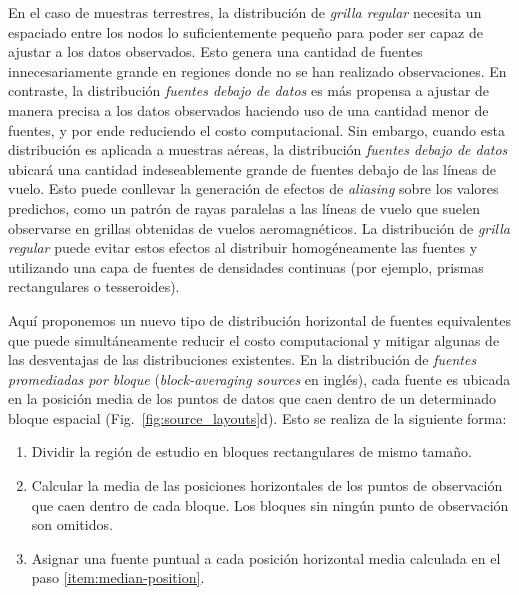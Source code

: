 En el caso de muestras terrestres, la distribución de \emph{grilla regular}
necesita un espaciado entre los nodos lo suficientemente pequeño para poder ser
capaz de ajustar a los datos observados.
Esto genera una cantidad de fuentes innecesariamente grande en regiones donde
no se han realizado observaciones.
En contraste, la distribución \emph{fuentes debajo de datos} es más propensa
a ajustar de manera precisa a los datos observados haciendo uso de una cantidad
menor de fuentes, y por ende reduciendo el costo computacional.
Sin embargo, cuando esta distribución es aplicada a muestras aéreas, la
distribución \emph{fuentes debajo de datos} ubicará una cantidad
indeseablemente grande de fuentes debajo de las líneas de vuelo.
Esto puede conllevar la generación de efectos de \emph{aliasing} sobre los
valores predichos, como un patrón de rayas paralelas a las líneas de vuelo que
suelen observarse en grillas obtenidas de vuelos aeromagnéticos.
La distribución de \emph{grilla regular} puede evitar estos efectos al
distribuir homogéneamente las fuentes y utilizando una capa de fuentes de
densidades continuas (por ejemplo, prismas rectangulares o tesseroides).

Aquí proponemos un nuevo tipo de distribución horizontal de fuentes
equivalentes que puede simultáneamente reducir el costo computacional y mitigar
algunas de las desventajas de las distribuciones existentes.
En la distribución de \emph{fuentes promediadas por bloque}
(\emph{block-averaging sources} en inglés), cada fuente es ubicada en la
posición media de los puntos de datos que caen dentro de un determinado bloque
espacial (Fig.~\ref{fig:source_layouts}d).
Esto se realiza de la siguiente forma:

\begin{enumerate}
    \item Dividir la región de estudio en bloques rectangulares de mismo
        tamaño.
    \item \label{item:median-position} Calcular la media de las posiciones
        horizontales de los puntos de observación que caen dentro de cada
        bloque. Los bloques sin ningún punto de observación son omitidos.
    \item Asignar una fuente puntual a cada posición horizontal media calculada
        en el paso \ref{item:median-position}.
\end{enumerate}

